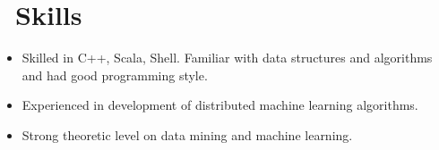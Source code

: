 \documentclass{resume}
\begin{document}
\section{\faCogs\ Skills}
\begin{itemize}[parsep=0.5ex]
  \item Skilled in C++, Scala, Shell. Familiar with data structures and algorithms and had good programming style.
  \item Experienced in development of distributed machine learning algorithms.
  \item Strong theoretic level on data mining and machine learning.
\end{itemize}


%
%
\end{document}
